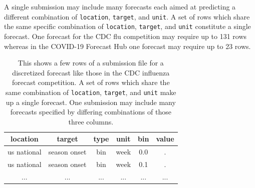 \documentclass[11pt,notitlepage]{isuthesis}
\begin{document}
A single submission may include many forecasts each aimed at predicting a 
different combination of \texttt{location}, \texttt{target}, and \texttt{unit}. 
A set of rows which share
the same specific combination of \texttt{location}, \texttt{target}, and 
\texttt{unit} constitute a single forecast. One forecast for the CDC flu
competition may require up to 131 rows whereas in the COVID-19 Forecast Hub one 
forecast may require up to 23 rows.


\begin{table}[h!]
\begin{center}
\begin{minipage}{10cm}
\captionsetup{font=scriptsize}
\centering
 \begin{tabular}{|c|c|c|c|c|c|}
 \hline
    location & target & type & unit & bin & value  \\ \hline
    us national & season onset & bin & week & 0.0 & . \\
    us national & season onset & bin & week & 0.1 & . \\
    ... & ... & ... & ... & ... & ... \\
 \hline
 \end{tabular}
 \caption[Influenza competition submission example]{This shows a few rows of a 
 submission file
 for a discretized forecast like those in the CDC influenza forecast 
 competition. A set of rows which share the same combination of 
 \texttt{location}, \texttt{target}, and \texttt{unit} make up a
 single forecast. One submission may include many forecasts specified by 
 differing combinations of those three columns.}
 \label{table:dstan}
 \end{minipage}
 \end{center}
\end{table}
\end{document}
